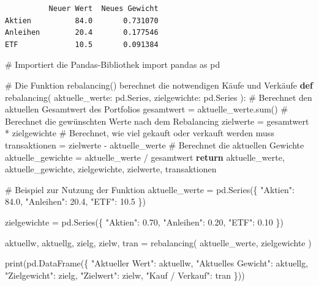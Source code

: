 \documentclass[
  ngerman,
  a4paper,
  DIV=11,
  oneside]{scrreprt}
\newenvironment{Shaded}{\begin{snugshade}}{\end{snugshade}}
\newcommand{\BuiltInTok}[1]{\textcolor[rgb]{0.00,0.23,0.31}{#1}}
\newcommand{\CommentTok}[1]{\textcolor[rgb]{0.37,0.37,0.37}{#1}}
\newcommand{\ControlFlowTok}[1]{\textcolor[rgb]{0.00,0.23,0.31}{\textbf{#1}}}
\newcommand{\FloatTok}[1]{\textcolor[rgb]{0.68,0.00,0.00}{#1}}
\newcommand{\ImportTok}[1]{\textcolor[rgb]{0.00,0.46,0.62}{#1}}
\newcommand{\KeywordTok}[1]{\textcolor[rgb]{0.00,0.23,0.31}{\textbf{#1}}}
\newcommand{\NormalTok}[1]{\textcolor[rgb]{0.00,0.23,0.31}{#1}}
\newcommand{\OperatorTok}[1]{\textcolor[rgb]{0.37,0.37,0.37}{#1}}
\newcommand{\StringTok}[1]{\textcolor[rgb]{0.13,0.47,0.30}{#1}}
\begin{document}
\begin{verbatim}
          Neuer Wert  Neues Gewicht
Aktien          84.0       0.731070
Anleihen        20.4       0.177546
ETF             10.5       0.091384
\end{verbatim}

\begin{Shaded}
\begin{Highlighting}[]
\CommentTok{\# Importiert die Pandas{-}Bibliothek}
\ImportTok{import}\NormalTok{ pandas }\ImportTok{as}\NormalTok{ pd}

\CommentTok{\# Die Funktion rebalancing() berechnet die notwendigen Käufe und Verkäufe}
\KeywordTok{def}\NormalTok{ rebalancing(}
\NormalTok{    aktuelle\_werte: pd.Series,}
\NormalTok{    zielgewichte: pd.Series}
\NormalTok{):}
    \CommentTok{\# Berechnet den aktuellen Gesamtwert des Portfolios}
\NormalTok{    gesamtwert }\OperatorTok{=}\NormalTok{ aktuelle\_werte.}\BuiltInTok{sum}\NormalTok{()}
    \CommentTok{\# Berechnet die gewünschten Werte nach dem Rebalancing}
\NormalTok{    zielwerte }\OperatorTok{=}\NormalTok{ gesamtwert }\OperatorTok{*}\NormalTok{ zielgewichte}
    \CommentTok{\# Berechnet, wie viel gekauft oder verkauft werden muss}
\NormalTok{    transaktionen }\OperatorTok{=}\NormalTok{ zielwerte }\OperatorTok{{-}}\NormalTok{ aktuelle\_werte}
    \CommentTok{\# Berechnet die aktuellen Gewichte}
\NormalTok{    aktuelle\_gewichte }\OperatorTok{=}\NormalTok{ aktuelle\_werte }\OperatorTok{/}\NormalTok{ gesamtwert}
    \ControlFlowTok{return}\NormalTok{ aktuelle\_werte, aktuelle\_gewichte, zielgewichte, zielwerte, transaktionen}


\CommentTok{\# Beispiel zur Nutzung der Funktion}
\NormalTok{aktuelle\_werte }\OperatorTok{=}\NormalTok{ pd.Series(\{}
    \StringTok{"Aktien"}\NormalTok{: }\FloatTok{84.0}\NormalTok{,}
    \StringTok{"Anleihen"}\NormalTok{: }\FloatTok{20.4}\NormalTok{,}
    \StringTok{"ETF"}\NormalTok{: }\FloatTok{10.5}
\NormalTok{\})}

\NormalTok{zielgewichte }\OperatorTok{=}\NormalTok{ pd.Series(\{}
    \StringTok{"Aktien"}\NormalTok{: }\FloatTok{0.70}\NormalTok{,}
    \StringTok{"Anleihen"}\NormalTok{: }\FloatTok{0.20}\NormalTok{,}
    \StringTok{"ETF"}\NormalTok{: }\FloatTok{0.10}
\NormalTok{\})}

\NormalTok{aktuellw, aktuellg, zielg, zielw, tran }\OperatorTok{=}\NormalTok{ rebalancing(}
\NormalTok{    aktuelle\_werte,}
\NormalTok{    zielgewichte}
\NormalTok{)}

\BuiltInTok{print}\NormalTok{(pd.DataFrame(\{}
        \StringTok{"Aktueller Wert"}\NormalTok{: aktuellw,}
        \StringTok{"Aktuelles Gewicht"}\NormalTok{: aktuellg,}
        \StringTok{"Zielgewicht"}\NormalTok{: zielg,}
        \StringTok{"Zielwert"}\NormalTok{: zielw,}
        \StringTok{"Kauf / Verkauf"}\NormalTok{: tran}
\NormalTok{\}))}
\end{Highlighting}
\end{Shaded}
\end{document}

